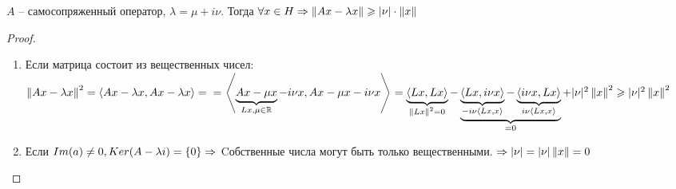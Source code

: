 \begin{statement}
    $A$ -- самосопряженный оператор, $\lambda = \mu + i \nu$.
    Тогда $\forall x \in H \Rightarrow 
    \left\|Ax - \lambda x\right\| \geqslant |\nu| \cdot \left\|x\right\|$
\end{statement}
\begin{proof}\
    \begin{enumerate}
    	\item Если матрица состоит из вещественных чисел:
            $\left\|Ax - \lambda x\right\|^2 = \left\langle Ax - \lambda x , Ax - \lambda x\right\rangle = \\ 
            = \left\langle \underbrace{Ax - \mu x} _{Lx, \mu \in \mathbb{R}} - i \nu x , Ax - \mu x - i \nu x\right\rangle =
            \underbrace{\left\langle Lx , Lx\right\rangle}_{\left\|Lx\right\|^2 = 0} - 
            \underbrace{
                \underbrace{\left\langle Lx , i \nu x\right\rangle} _{- i \nu \left\langle Lx , x\right\rangle} - 
                \underbrace{\left\langle i \nu x , Lx\right\rangle}_{i \nu \left\langle Lx , x\right\rangle}
            }_{= 0} + 
            |\nu|^2 \left\|x\right\|^2 \geqslant |\nu|^2 \left\|x\right\|^2$
        \item Если $Im(a) \neq 0, \\ 
            Ker(A - \lambda i) = \{0\} \Rightarrow$
            Cобственные числа могут быть только вещественными.
            $\Rightarrow |\nu| = |\nu|\left\|x\right\| = 0$
    \end{enumerate}
\end{proof}


